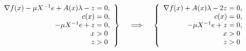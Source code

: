 \documentclass{article}
\begin{document}
\begin{align*}
	\left.\begin{array}{r@{\mskip\thickmuskip}l}
		\nabla f(x) -\mu X^{-1} e + A(x) \lambda - z &= 0, \\
		c(x) &= 0, \\
		-\mu X^{-1} e + z &= 0, \\
		x &> 0 \\
		z &> 0
	\end{array} \right\}
	\quad \implies \quad
	\left\{\begin{array}{r@{\mskip\thickmuskip}l}
		\nabla f(x) + A(x) \lambda - 2z &= 0, \\
		c(x) &= 0, \\
		-\mu X^{-1} e + z &= 0, \\
		x &> 0 \\
		z &> 0
	\end{array}\right.
\end{align*}
\end{document}
